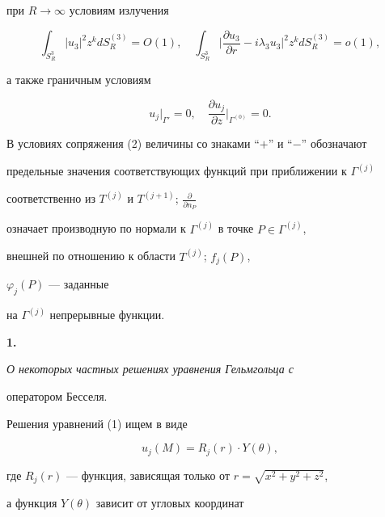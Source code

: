 при $R\to \infty$ условиям излучения


\begin{equation}


\int_{S_R^{3}}|u_3|^2 z^k dS_R^{(3)}=O(1),\quad


\int_{S_R^{3}}\bigg|\frac{\partial u_3}{\partial r}-i\lambda_3 u_3


\bigg|^2 z^k dS_R^{(3)}=o(1),


\end{equation}


а также граничным условиям


\begin{equation}


u_j|_{\Gamma'}=0,\quad


\frac{\partial u_j}{\partial z}\Big|_{\Gamma^{(0)}}=0.


\end{equation}





В условиях сопряжения (2) величины со знаками ``$+$'' и ``$-$'' обозначают 


предельные значения соответствующих функций при приближении к $\Gamma^{(j)}$


соответственно из $T^{(j)}$ и $T^{(j+1)}$; $\frac{\partial}{\partial n_P}$ 


означает производную по нормали к $\Gamma^{(j)}$ в точке $P\in \Gamma^{(j)}$, 


внешней по отношению к области $T^{(j)}$; $f_j(P)$,


$\varphi_j(P)$ --- заданные 


на $\Gamma^{(j)}$ непрерывные функции.


\medskip








{\bf 1.} {\it О некоторых частных решениях уравнения Гельмгольца с


оператором Бесселя.}


Решения уравнений (1) ищем в виде 


\begin{equation}


u_j(M)=R_j(r)\cdot Y(\theta),


\end{equation}


где $R_j(r)$ --- функция, зависящая только от $r=\sqrt{x^2+y^2+z^2}$,


а функция $Y(\theta)$ зависит от угловых координат 


